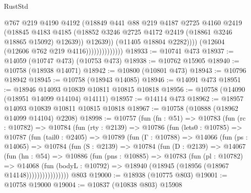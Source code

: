 \begin{lexlean}{RustStd}
\begin{coremodule}
                                    @767
                                    @219
                                    @4190
                                    @4192
                                    (@18849
                                      @441
                                      @88
                                      @219
                                      @4187
                                      @2725
                                      @4160
                                      @2419
                                      (@18845
                                        @4183
                                        @4185
                                        (@18852
                                          @3246
                                          @2725
                                          @4172
                                          @2419
                                          (@18861 @3246 @18865 @15092)
                                          @12639))
                                      @12639))
                                  (@11405 @18804 @2282))))
                            (@12604 (@12606 @762 @219 @4116))))))))))))))
@18933 := @10741 @473
@18937 := @14059 (@10747 @473) (@10753 @473)
@18938 := @10762 @15905
@18940 := @10758 (@18938 @14071)
@18942 := @10800 (@10801 @473)
@18943 := @10796 @18942
@18945 := @10758 (@18943 @14085)
@18946 := @14091 @473
@18951 := @18946 @14093 @10839 @10811 @10815 @10818
@18956 := @10758 (@14090 (@18951 @14099 @14104) @14111)
@18957 := @14114 @473
@18962 := @18957 @14093 @10839 @10811 @10815 @10818
@18967 := @10758 (@10888 (@18962 @14099 @14104) @2208)
@18998 := @10757
    (fun (fn : @51) =>
    @10783
      (fun (rc : @10782) =>
      @10784
        (fun (rty : @2139) =>
        @10786
          (fun (lets0 : @10785) =>
          @10787
            (fun (tail0 : @2405) =>
            @10789
              (fun (Γ : @10788) =>
              @14066
                (fun (ps : @14065) =>
                @10784
                  (fun (S : @2139) =>
                  @10784
                    (fun (D : @2139) =>
                    @14067
                      (fun (hn : @54) =>
                      @10886
                        (fun (pns : @10885) =>
                        @10783
                          (fun (pl : @10782) =>
                          @14068
                            (fun (bodyL : @10792) =>
                            @18940 (@18945 (@18956 (@18967 @14148))))))))))))))))
    @803
@19000 := @18938 (@10775 @803)
@19001 := @10758 @19000
@19004 := @10837 (@10838 @803) @15908

\end{coremodule}
\end{lexlean}

